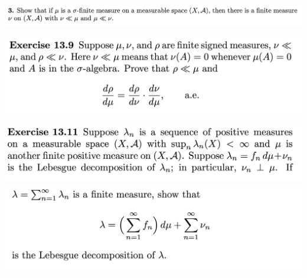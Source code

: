\begin{mdframed}
\includegraphics[width=400pt]{img/analysis--berkeley-202a-hw11-3704.png}
\end{mdframed}


\begin{mdframed}
\includegraphics[width=400pt]{img/analysis--berkeley-202a-hw11-f2c0.png}
\end{mdframed}


\begin{mdframed}
\includegraphics[width=400pt]{img/analysis--berkeley-202a-hw11-c5a4.png}
\includegraphics[width=400pt]{img/analysis--berkeley-202a-hw11-3974.png}
\end{mdframed}